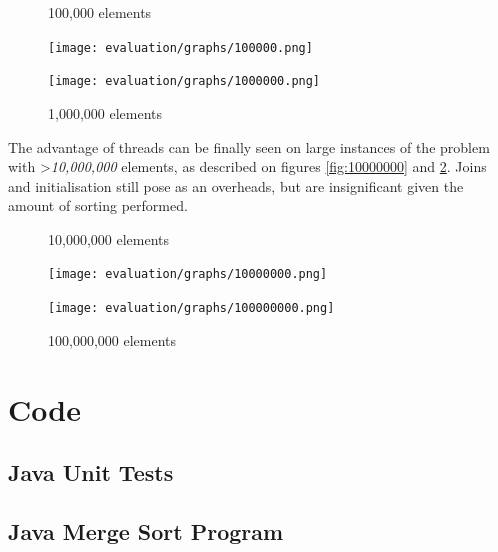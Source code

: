 \documentclass{article}
\begin{document}
  \begin{figure}
  \centering
  \begin{minipage}{0.45\textwidth}
    \caption{100,000 elements}
    \texttt{[image: evaluation/graphs/100000.png]}
    \label{fig:100000}
  \end{minipage}
  \begin{minipage}{0.45\textwidth}
    \caption{1,000,000 elements}
    \texttt{[image: evaluation/graphs/1000000.png]}
    \label{fig:1000000}
  \end{minipage}
  \end{figure}

  The advantage of threads can be finally seen on large instances of the problem with \textgreater\textit{10,000,000} elements, as described on figures \ref{fig:10000000} and \ref{fig:100000000}. Joins and initialisation still pose as an overheads, but are insignificant given the amount of sorting performed.

  \clearpage

  \begin{figure}
  \centering
  \begin{minipage}{0.45\textwidth}
    \caption{10,000,000 elements}
    \texttt{[image: evaluation/graphs/10000000.png]}
    \label{fig:10000000}
  \end{minipage}
  \begin{minipage}{0.45\textwidth}
    \caption{100,000,000 elements}
    \texttt{[image: evaluation/graphs/100000000.png]}
    \label{fig:100000000}
  \end{minipage}
  \end{figure}

  \section{Code}
    \subsection{Java Unit Tests}
      

    \subsection{Java Merge Sort Program}
      
\end{document}
